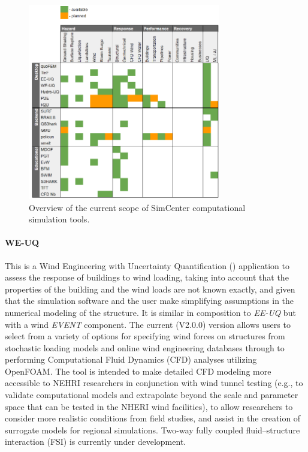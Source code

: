 \begin{figure}[htb]
    \centering
    \includegraphics[width=0.75\textwidth, angle = 0]{Figures/tool_overview.pdf}
    \caption{Overview of the current scope of SimCenter computational simulation tools.}
    \label{fig:intro_tool_overview}
\end{figure}

\paragraph{WE-UQ} This is a Wind Engineering with Uncertainty Quantification () application to assess the response of buildings to wind loading, taking into account that the properties of the building and the wind loads are not known exactly, and given that the simulation software and the user make simplifying assumptions in the numerical modeling of the structure. It is similar in composition to \emph{EE-UQ} but with a wind \emph{EVENT} component.  The current (V2.0.0) version allows users to select from a variety of options for specifying wind forces on structures from stochastic loading models and online wind engineering databases through to performing Computational Fluid Dynamics (CFD) analyses utilizing OpenFOAM. The tool is intended to make detailed CFD modeling more accessible to NEHRI researchers in conjunction with wind tunnel testing (e.g., to validate computational models and extrapolate beyond the scale and parameter space that can be tested in the NHERI wind facilities), to allow researchers to consider more realistic conditions from field studies, and assist in the creation of surrogate models for regional simulations. Two-way fully coupled fluid--structure interaction (FSI) is currently under development.

